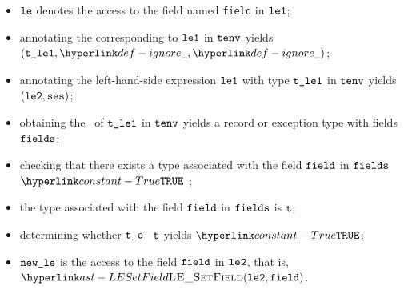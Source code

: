 \ProseParagraph
\AllApply
\begin{itemize}
  \item $\vle$ denotes the access to the field named \texttt{field} in $\vleone$;
  \item annotating the \rhsexpression{} corresponding to $\vleone$ in $\tenv$ yields \\ $(\vtleone, \Ignore, \Ignore)$\ProseOrTypeError;
  \item annotating the left-hand-side expression  $\vleone$ with type $\vtleone$ in $\tenv$ yields \\ $(\vletwo, \vses)$\ProseOrTypeError;
  \item obtaining the \underlyingtypeterm\ of $\vtleone$ in $\tenv$ yields a record
    or exception type with fields $\fields$\ProseOrTypeError;
  \item checking that there exists a type associated with the field $\vfield$ in $\fields$ $\True$ \ProseTerminateAs{\BadField};
  \item the type associated with the field $\vfield$ in $\fields$ is $\vt$;
  \item determining whether $\vte$ \typesatisfiesterm\ $\vt$ yields $\True$\ProseOrTypeError;
  \item $\newle$ is the access to the field $\vfield$ in $\vletwo$, that is, $\LESetField(\vletwo, \vfield)$.
\end{itemize}

\FormallyParagraph
\begin{mathpar}
\end{mathpar}

